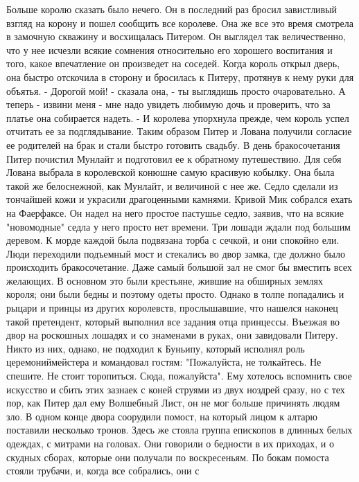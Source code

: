     Больше королю сказать было нечего. Он в последний раз бросил 
завистливый взгляд на корону и пошел сообщить все королеве.
    Она же все это время смотрела в замочную скважину и восхищалась 
Питером. Он выглядел так величественно, что у нее исчезли всякие 
сомнения относительно его хорошего воспитания и того, какое 
впечатление он произведет на соседей. Когда король открыл дверь, она 
быстро отскочила в сторону и бросилась к Питеру, протянув к нему руки 
для объятья.
    - Дорогой мой! - сказала она, - ты выглядишь просто очаровательно. 
А теперь - извини меня - мне надо увидеть любимую дочь и проверить, 
что за платье она собирается надеть. - И королева упорхнула прежде, 
чем король успел отчитать ее за подглядывание.
    Таким образом Питер и Лована получили согласие ее родителей на 
брак и стали быстро готовить свадьбу.
    В день бракосочетания Питер почистил Мунлайт и подготовил ее к 
обратному путешествию. Для себя Лована выбрала в королевской конюшне 
самую красивую кобылку. Она была такой же белоснежной, как Мунлайт, и 
величиной с нее же. Седло сделали из тончайшей кожи и украсили 
драгоценными камнями.
    Кривой Мик собрался ехать на Фаерфаксе. Он надел на него простое 
пастушье седло, заявив, что на всякие "новомодные" седла у него просто 
нет времени.
    Три лошади ждали под большим деревом. К морде каждой была 
подвязана торба с сечкой, и они спокойно ели.
    Люди переходили подъемный мост и стекались во двор замка, где 
должно было происходить бракосочетание. Даже самый большой зал не смог 
бы вместить всех желающих. В основном это были крестьяне, жившие на 
обширных землях короля; они были бедны и поэтому одеты просто. Однако 
в толпе попадались и рыцари и принцы из других королевств, 
прослышавшие, что нашелся наконец такой претендент, который выполнил 
все задания отца принцессы. Въезжая во двор на роскошных лошадях и со 
знаменами в руках, они завидовали Питеру.
    Никто из них, однако, не подходил к Буньипу, который исполнял роль 
церемониймейстера и командовал гостям: "Пожалуйста, не толкайтесь. Не 
спешите. Не стоит торопиться. Сюда, пожалуйста". Ему хотелось 
вспомнить свое искусство и сбить этих зазнаек с коней струями из двух 
ноздрей сразу, но с тех пор, как Питер дал ему Волшебный Лист, он не 
мог больше причинять людям зло.
    В одном конце двора соорудили помост, на который лицом к алтарю 
поставили несколько тронов. Здесь же стояла группа епископов в длинных 
белых одеждах, с митрами на головах. Они говорили о бедности в их 
приходах, и о скудных сборах, которые они получали по воскресеньям.
    По бокам помоста стояли трубачи, и, когда все собрались, они с 
